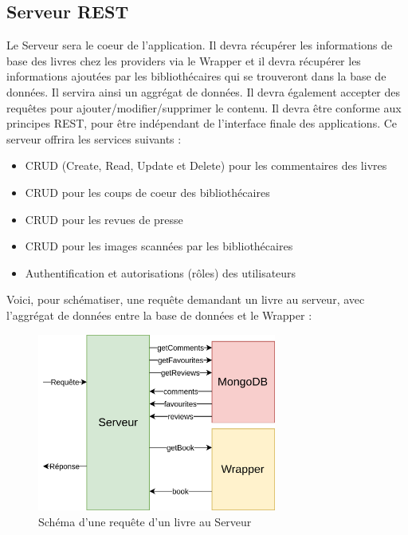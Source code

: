 \documentclass[a4paper, 12pt]{article}
\begin{document}
\subsection{Serveur REST}
Le Serveur sera le coeur de l'application. Il devra récupérer les informations de base des livres chez les providers 
via le Wrapper et il devra récupérer les informations ajoutées par les bibliothécaires qui se trouveront dans la base 
de données. Il servira ainsi un aggrégat de données. Il devra également accepter des requêtes pour 
ajouter/modifier/supprimer le contenu. Il devra être conforme aux principes REST, pour être indépendant de l'interface 
finale des applications. Ce serveur offrira les services suivants :
\begin{itemize}
    \item CRUD (Create, Read, Update et Delete) pour les commentaires des livres
    \item CRUD pour les coups de coeur des bibliothécaires
    \item CRUD pour les revues de presse
    \item CRUD pour les images scannées par les bibliothécaires
    \item Authentification et autorisations (rôles) des utilisateurs
\end{itemize}
Voici, pour schématiser, une requête demandant un livre au serveur, avec l'aggrégat de données entre la base de données 
et le Wrapper :
\begin{figure}
    \begin{center}
        \includegraphics[width=0.7\textwidth]{images/architecture_server.png}
    \end{center}
    \caption{Schéma d'une requête d'un livre au Serveur}
\end{figure}
\end{document}

